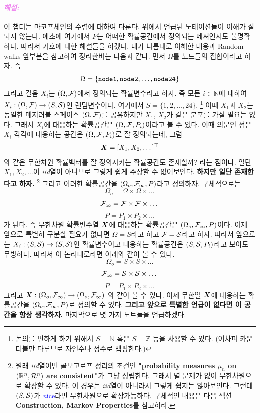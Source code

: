 \documentclass[12pt,oneside,english,a4paper]{article}
\newcommand{\paraviolet}[1]{\paragraph{\LARGE\textcolor{violet}{\it\underline{\textbf{#1:}}}}\LARGE}
\newcommand{\bsX}{\mbox{\boldmath $X$}}
\begin{document}
\paraviolet{해설} 이 챕터는 마코프체인의 수렴에 대하여 다룬다. 위에서 언급된 노테이션들이 이해가 잘 되지 않는다. 애초에 여기에서 $P$는 어떠한 확률공간에서 정의되는 메져인지도 불명확하다. 따라서 기호에 대한 해설들을 하겠다. 내가 나름대로 이해한 내용과 Random walks 앞부분을 참고하여 정리한바는 다음과 같다. 먼저 $\Omega$를 노드들의 집합이라고 하자. 즉 
\[
\Omega=\{{\tt node 1, node 2, \dots, node 24}\}
\]
그리고 걸음 $X_i$는 $(\Omega,{\cal F})$에서 정의되는 확률변수라고 하자. 즉 모든 $i\in\mathbb{N}$에 대하여 $X_i:(\Omega,{\cal F}) \to (S,{\cal S})$인 랜덤변수이다. 여기에서 $S=\{1,2,\dots,24\}$. \footnote{논의를 편하게 하기 위해서 $S=\mathbb{N}$ 혹은 $S=\mathbb{Z}$ 등을 사용할 수 있다. (어차피 카운터블만 다루므로 자연수나 정수로 맵핑한다.)} 이때 $X_1$과 $X_2$는 동일한 메저러블 스페이스 $(\Omega,{\cal F})$를 공유하지만 $X_1$, $X_2$가 같은 분포를 가질 필요는 없다. 그래서 $X_i$에 대응하는 확률공간은 $(\Omega,{\cal F},P_i)$이라고 볼 수 있다. 이때 의문인 점은 $X_i$ 각각에 대응하는 공간은 $(\Omega,{\cal F},P_i)$로 잘 정의되는데, 그럼 
\[
\bsX=[X_1,X_2,\dots]^\top
\]
와 같은 무한차원 확률벡터를 잘 정의시키는 확률공간도 존재할까? 라는 점이다.  일단 $X_1,X_2,\dots$이 \emph{iid}열이 아니므로 그렇게 쉽게 주장할 수 없어보인다. \textbf{하지만 일단 존재한다고 하자.} \footnote{원래 \emph{iid}열이면 콜모고로프 정리의 조건인 \textbf{"probability measures $\mu_n$ on $(\mathbb{R}^n,{\cal R}^{n})$ are consistent"}가 그냥 성립한다. 그래서 별 문제가 없이 무한차원으로 확장할 수 있다. 이 경우는 \emph{iid}열이 아니라서 그렇게 쉽지는 않아보인다. 그런데 $(S,{\cal S})$가 \textcolor{blue}{{\emph nice}}라면 무한차원으로 확장가능하다. 구체적인 내용은 다음 섹션 \textbf{Construction, Markov Properties}를 참고하라.} 그리고 이러한 확률공간을 $(\Omega_o,{\cal F}_{\infty},P)$라고 정의하자. 구체적으로는
\[
\Omega_o=\Omega \times \Omega \times \dots 
\]
\[
{\cal F}_{\infty}={\cal F}\times {\cal F} \times \dots 
\]
\[
P=P_1\times P_2\times \dots 
\]
가 된다. 즉 무한차원 확률변수열 $\bsX$에 대응하는 확률공간은 $(\Omega_o,{\cal F}_{\infty},P)$이다. 이제 앞으로 특별히 구분할 필요가 없다면 $\Omega=S$라고 하고 ${\cal F}={\cal S}$라고 하자. 따라서 앞으로는 $X_i:(S,{\cal S})\to(S,{\cal S})$인 확률변수이고 대응하는 확률공간은 $(S,{\cal S},P_i)$라고 보아도 무방하다. 따라서 이 논리대로라면 아래와 같이 볼 수 있다. 
\[
\Omega_o=S \times S \times \dots 
\]
\[
{\cal F}_{\infty}={\cal S}\times {\cal S} \times \dots 
\]
\[
P=P_1\times P_2\times \dots 
\]
 그리고 $\bsX:(\Omega_o,{\cal F}_{\infty}) \to (\Omega_o,{\cal F}_{\infty})$ 와 같이 볼 수 있다. 이제 무한열 $\bsX$에 대응하는 확률공간을 $(\Omega_o, {\cal F}_{\infty},P)$로 정의할 수 있다. {\bf 그리고 앞으로 특별한 언급이 없다면 이 공간을 항상 생각하자.} 마지막으로 몇 가지 노트들을 언급하겠다. 
\end{document}
